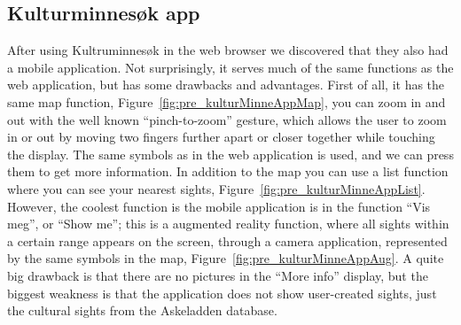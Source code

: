 \documentclass[11pt]{book}
\begin{document}
\subsection{Kulturminnesøk app}
After using Kultruminnesøk in the web browser we discovered that they also had a mobile application. Not surprisingly, it serves much of the same functions as the web application, but has some drawbacks and  advantages. First of all, it has the same map function, Figure~\ref{fig:pre_kulturMinneAppMap}, you can zoom in and out with the well known ``pinch-to-zoom'' gesture, which allows the user to zoom in or out by moving two fingers further apart or closer together while touching the display. The same symbols as in the web application is used, and we can press them to get more information. In addition to the map you can use a list function where you can see your nearest sights, Figure~\ref{fig:pre_kulturMinneAppList}. However, the coolest function is the mobile application is in the function ``Vis meg'', or ``Show me''; this is a augmented reality function, where all sights within a certain range appears on the screen, through a camera application, represented by the same symbols in the map, Figure~\ref{fig:pre_kulturMinneAppAug}.  A quite big drawback is that there are no pictures in the ``More info'' display, but the biggest weakness is that the application does not show user-created sights, just the cultural sights from the Askeladden database.
\end{document}
